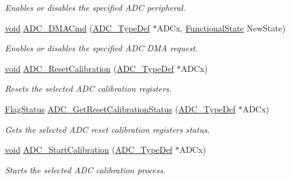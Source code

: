 \begin{DoxyCompactItemize}
\begin{DoxyCompactList}\small\item\em Enables or disables the specified A\+DC peripheral. \end{DoxyCompactList}\item 
\hyperlink{usb__devapi_8h_afabf60e7f57651d6d595a02c75f07cd0}{void} \hyperlink{group___a_d_c___exported___functions_gac5881d5995818001584b27b137a8dbcb}{A\+D\+C\+\_\+\+D\+M\+A\+Cmd} (\hyperlink{struct_a_d_c___type_def}{A\+D\+C\+\_\+\+Type\+Def} $\ast$A\+D\+Cx, \hyperlink{agilefox_2library_2inc_2stm32f10x__type_8h_ac9a7e9a35d2513ec15c3b537aaa4fba1}{Functional\+State} New\+State)
\begin{DoxyCompactList}\small\item\em Enables or disables the specified A\+DC D\+MA request. \end{DoxyCompactList}\item 
\hyperlink{usb__devapi_8h_afabf60e7f57651d6d595a02c75f07cd0}{void} \hyperlink{group___a_d_c___exported___functions_ga3d542020ba28c1d16238a0defbee6d8f}{A\+D\+C\+\_\+\+Reset\+Calibration} (\hyperlink{struct_a_d_c___type_def}{A\+D\+C\+\_\+\+Type\+Def} $\ast$A\+D\+Cx)
\begin{DoxyCompactList}\small\item\em Resets the selected A\+DC calibration registers. \end{DoxyCompactList}\item 
\hyperlink{agilefox_2library_2inc_2stm32f10x__type_8h_a89136caac2e14c55151f527ac02daaff}{Flag\+Status} \hyperlink{group___a_d_c___exported___functions_ga113be9fe25add8d7496bed659c68e02b}{A\+D\+C\+\_\+\+Get\+Reset\+Calibration\+Status} (\hyperlink{struct_a_d_c___type_def}{A\+D\+C\+\_\+\+Type\+Def} $\ast$A\+D\+Cx)
\begin{DoxyCompactList}\small\item\em Gets the selected A\+DC reset calibration registers status. \end{DoxyCompactList}\item 
\hyperlink{usb__devapi_8h_afabf60e7f57651d6d595a02c75f07cd0}{void} \hyperlink{group___a_d_c___exported___functions_gadcba6341124a6aabfd2dd885ca8e5f14}{A\+D\+C\+\_\+\+Start\+Calibration} (\hyperlink{struct_a_d_c___type_def}{A\+D\+C\+\_\+\+Type\+Def} $\ast$A\+D\+Cx)
\begin{DoxyCompactList}\small\item\em Starts the selected A\+DC calibration process. \end{DoxyCompactList}\item 

\end{DoxyCompactItemize}
